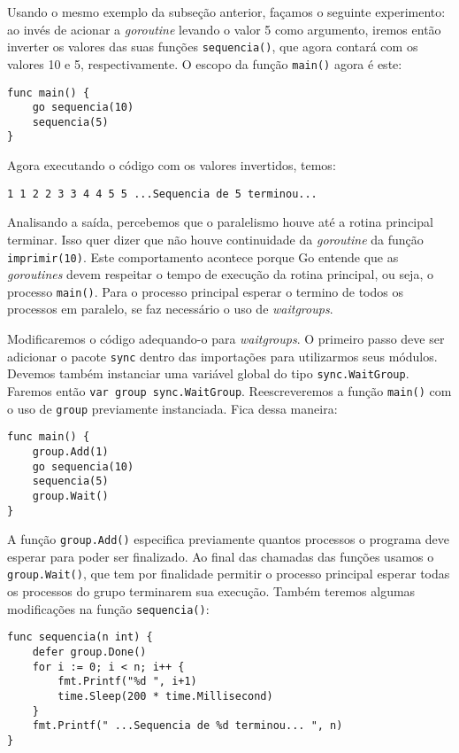\documentclass{SBCbookchapter}
\begin{document}
Usando o mesmo exemplo da subseção anterior, façamos o seguinte experimento: ao invés de acionar a \textit{goroutine} levando o valor 5 como argumento, iremos então inverter os valores das suas funções \texttt{sequencia()}, que agora contará com os valores 10 e 5, respectivamente. O escopo da função \texttt{main()} agora é este: 

\begin{lstlisting}
func main() {
	go sequencia(10)
	sequencia(5)
}
\end{lstlisting}

Agora executando o código com os valores invertidos, temos: 

\noindent\texttt{1 1 2 2 3 3 4 4 5 5  ...Sequencia de 5 terminou...}

Analisando a saída, percebemos que o paralelismo houve até a rotina principal terminar. Isso quer dizer que não houve continuidade da \textit{goroutine} da função \texttt{imprimir(10)}. Este comportamento acontece porque Go entende que as \textit{goroutines} devem respeitar o tempo de execução da rotina principal, ou seja, o processo \texttt{main()}. Para o processo principal esperar o termino de todos os processos em paralelo, se faz necessário o uso de \textit{waitgroups}.

Modificaremos o código adequando-o para \textit{waitgroups}. O primeiro passo deve ser adicionar o pacote \texttt{sync} dentro das importações para utilizarmos seus módulos. Devemos também instanciar uma variável global do tipo \texttt{sync.WaitGroup}. Faremos então \texttt{var group sync.WaitGroup}. Reescreveremos a função \texttt{main()} com o uso de \texttt{group} previamente instanciada. Fica dessa maneira:

\begin{lstlisting}
func main() {
	group.Add(1)
	go sequencia(10)
	sequencia(5)
	group.Wait()
}
\end{lstlisting}

A função \texttt{group.Add()} especifica previamente quantos processos o programa deve esperar para poder ser finalizado. Ao final das chamadas das funções usamos o \texttt{group.Wait()}, que tem por finalidade permitir o processo principal esperar todas os processos do grupo terminarem sua execução. Também teremos algumas modificações na função \texttt{sequencia()}:

\begin{lstlisting}
func sequencia(n int) {
	defer group.Done()
	for i := 0; i < n; i++ {
		fmt.Printf("%d ", i+1)
		time.Sleep(200 * time.Millisecond)
	}
	fmt.Printf(" ...Sequencia de %d terminou... ", n)
}
\end{lstlisting}
\end{document}
